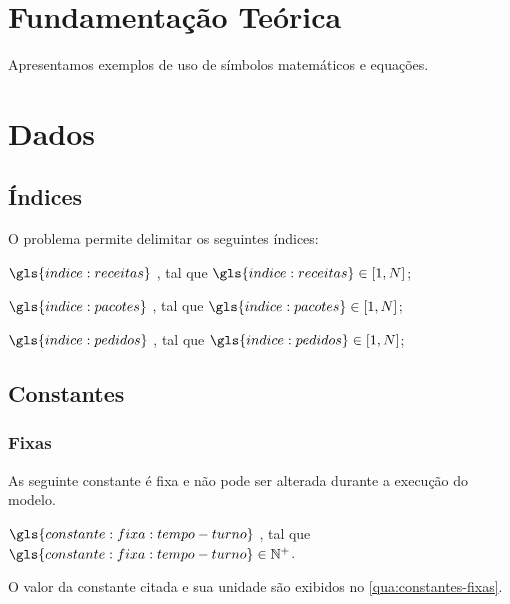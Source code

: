\section{Fundamentação Teórica}%
\label{sec:fundamentacao}

Apresentamos exemplos de uso de símbolos matemáticos e equações.

\section{Dados}

\subsection{Índices}

O problema permite delimitar os seguintes índices:

\begin{symbols}
    \item[\( \gls{indice:receitas} \)]
    ,
    tal que \(  \gls{indice:receitas} \in [1, N] \);

    \item[\( \gls{indice:pacotes} \)]
    ,
    tal que \(  \gls{indice:pacotes} \in [1, N] \);

    \item[\( \gls{indice:pedidos} \)]
    ,
    tal que \(  \gls{indice:pedidos} \in [1, N] \);
\end{symbols}

\subsection{Constantes}

\subsubsection{Fixas}

As seguinte constante é fixa e não pode ser alterada durante a execução do modelo.

\begin{symbols}
    \item[\( \gls{constante:fixa:tempo-turno} \) ]
    ,
    tal que \( \gls{constante:fixa:tempo-turno} \in \mathbb{N}^{+} \).
\end{symbols}

O valor da constante citada e sua unidade são exibidos no \autoref{qua:constantes-fixas}.

